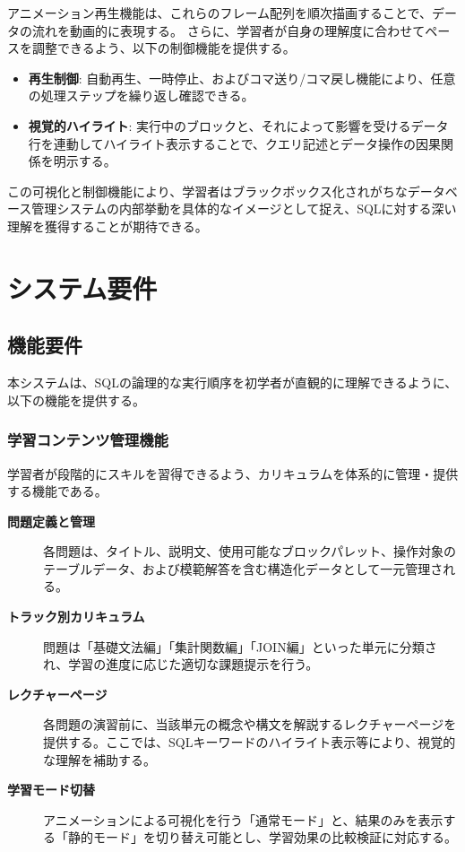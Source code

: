 \documentclass[uplatex,a4paper,12pt]{ujreport}
\begin{document}
アニメーション再生機能は、これらのフレーム配列を順次描画することで、データの流れを動画的に表現する。
さらに、学習者が自身の理解度に合わせてペースを調整できるよう、以下の制御機能を提供する。
\begin{itemize}
  \item \textbf{再生制御}: 自動再生、一時停止、およびコマ送り/コマ戻し機能により、任意の処理ステップを繰り返し確認できる。
  \item \textbf{視覚的ハイライト}: 実行中のブロックと、それによって影響を受けるデータ行を連動してハイライト表示することで、クエリ記述とデータ操作の因果関係を明示する。
\end{itemize}
\par
この可視化と制御機能により、学習者はブラックボックス化されがちなデータベース管理システムの内部挙動を具体的なイメージとして捉え、SQLに対する深い理解を獲得することが期待できる。
\section{システム要件}
\subsection{機能要件}
本システムは、SQLの論理的な実行順序を初学者が直観的に理解できるように、以下の機能を提供する。
\subsubsection*{学習コンテンツ管理機能}
学習者が段階的にスキルを習得できるよう、カリキュラムを体系的に管理・提供する機能である。
\begin{description}
  \item[\textbf{問題定義と管理}] 各問題は、タイトル、説明文、使用可能なブロックパレット、操作対象のテーブルデータ、および模範解答を含む構造化データとして一元管理される。
  \item[\textbf{トラック別カリキュラム}] 問題は「基礎文法編」「集計関数編」「JOIN編」といった単元に分類され、学習の進度に応じた適切な課題提示を行う。
  \item[\textbf{レクチャーページ}] 各問題の演習前に、当該単元の概念や構文を解説するレクチャーページを提供する。ここでは、SQLキーワードのハイライト表示等により、視覚的な理解を補助する。
  \item[\textbf{学習モード切替}] アニメーションによる可視化を行う「通常モード」と、結果のみを表示する「静的モード」を切り替え可能とし、学習効果の比較検証に対応する。
\end{description}
\end{document}
